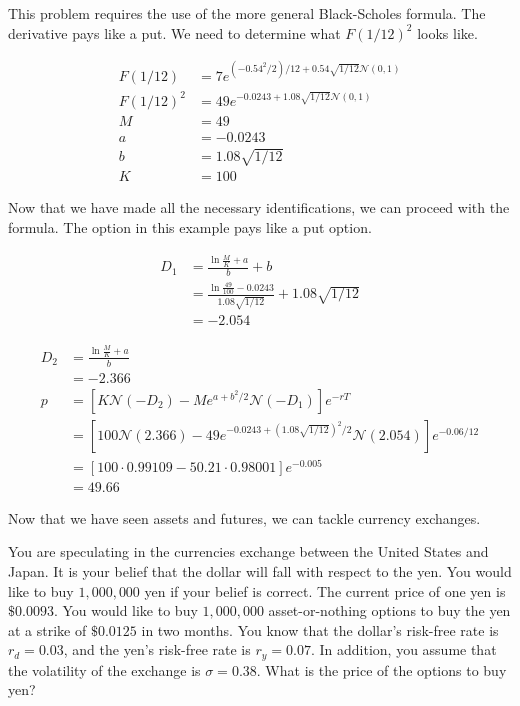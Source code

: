 \documentclass{ximera}
\begin{document}
\begin{solution}
This problem requires the use of the more general Black-Scholes formula. The derivative pays like a put. We need to determine what $F(1/12)^2$ looks like.

	\begin{align*}
	F(1/12) 	&=7e^{(-0.54^2/2)/12+0.54\sqrt{1/12}\mathcal{N}(0,1)}\\
	F(1/12)^2 	&=49e^{-0.0243+1.08\sqrt{1/12}\mathcal{N}(0,1)}\\
	M 		&=49\\
	a 		&=-0.0243\\
	b 		&=1.08\sqrt{1/12}\\
	K 		&=100
	\end{align*}

Now that we have made all the necessary identifications, we can proceed with the formula. The option in this example pays like a put option.

	\begin{align*}
	D_1 	&=\frac{\ln\frac{M}{K}+a}{b}+b\\
		&=\frac{\ln\frac{49}{100}-0.0243}{1.08\sqrt{1/12}}+1.08\sqrt{1/12}\\
		&=-2.054
	\end{align*}
	
	\begin{align*}
	D_2 	&=\frac{\ln\frac{M}{K}+a}{b}\\
		&=-2.366\\
	p 	&=\left[K\mathcal{N}(-D_2)-Me^{a+b^2/2}\mathcal{N}(-D_1)\right]e^{-rT}\\
		&=\left[100\mathcal{N}(2.366)-49e^{-0.0243+(1.08\sqrt{1/12})^2/2}\mathcal{N}(2.054)\right]e^{-0.06/12}\\
		&=\left[100\cdot 0.99109-50.21\cdot 0.98001\right]e^{-0.005}\\
		&=49.66
	\end{align*}

\end{solution}

Now that we have seen assets and futures, we can tackle currency exchanges.

\begin{example}
You are speculating in the currencies exchange between the United States and Japan. It is your belief that the dollar will fall with respect to the yen. You would like to buy $1,000,000$ yen if your belief is correct. The current price of one yen is $\$0.0093$. You would like to buy $1,000,000$ asset-or-nothing options to buy the yen at a strike of $\$0.0125$ in two months. You know that the dollar's risk-free rate is $r_d=0.03$, and the yen's risk-free rate is  $r_y=0.07$. In addition, you assume that the volatility of the exchange is $\sigma=0.38$. What is the price of the options to buy yen?
\end{example}
\end{document}
